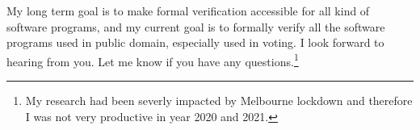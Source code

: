 \documentclass[11pt,a4paper,roman]{moderncv}
\begin{document}
\vspace{0.5cm}
My long term goal is to make formal verification accessible for all kind of 
software programs, and my current goal 
is to formally verify all the software programs used in 
public domain, especially used in voting. I look forward to hearing from you. 
Let me know if you have any 
questions.\footnote{My research had been severly impacted by Melbourne lockdown and therefore
I was not very productive in year 2020 and 2021.} \\
 


\vspace{0.5cm}


\makeletterclosing
\end{document}
